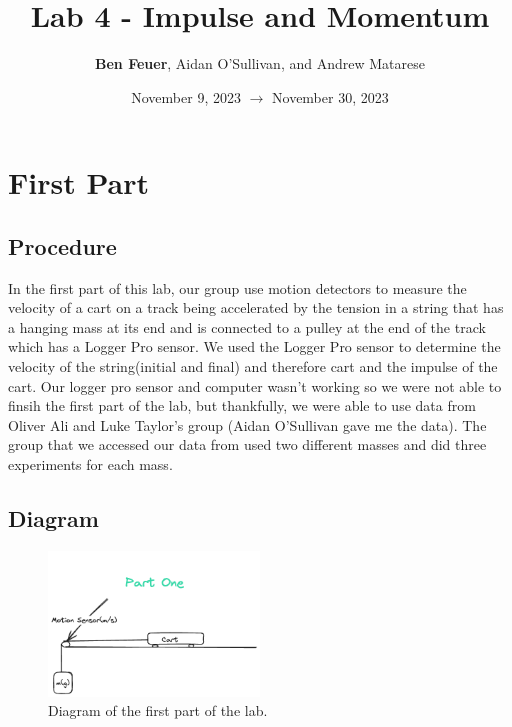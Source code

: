 \documentclass{report}
\title{\Huge{Lab 4 - Impulse and Momentum}}
\author{\huge{\textbf{Ben Feuer}, Aidan O'Sullivan, and Andrew Matarese}}
\date{November 9, 2023 $\to$ November 30, 2023}
\begin{document}
\maketitle
\newpage%
\pagebreak


\section*{First Part}

\subsection*{Procedure}

In the first part of this lab, our group use motion detectors to measure the velocity of a cart on a track being accelerated by the tension in a string that has a hanging mass at its end and is connected to a pulley at the end of the track which has a Logger Pro sensor. We used the Logger Pro sensor to determine the velocity of the string(initial and final) and therefore cart and the impulse of the cart. Our logger pro sensor and computer wasn't working so we were not able to finsih the first part of the lab, but thankfully, we were able to use data from Oliver Ali and Luke Taylor's group (Aidan O'Sullivan gave me the data). The group that we accessed our data from used two different masses and did three experiments for each mass. 

\subsection*{Diagram}

\begin{figure}[h!]
  \begin{center}
    \includegraphics[width=0.5\textwidth]{figures/partOne.png}
  \end{center}
  \caption{Diagram of the first part of the lab.}
\end{figure}
\end{document}

